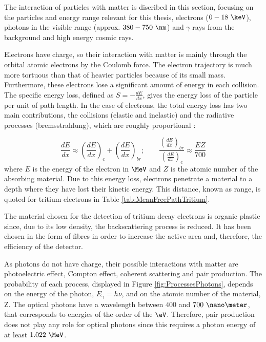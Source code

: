 The interaction of particles with matter is discribed in this section, focusing on the particles and energy range relevant for this thesis, electrons ($0-18~\keV$), photons in the visible range (approx. $380-750~\nm$) and $\gamma$ rays from the background and high energy cosmic rays.

Electrons have charge, so their interaction with matter is mainly through the orbital atomic  electrons by the Coulomb force. The electron trajectory is much more tortuous than that of heavier particles because of its small mass. Furthermore, these electrons lose a significant amount of energy in each collision. The specific energy loss, defined as $S=-\displaystyle{\frac{dE}{dx}}$, gives the energy loss of the particle per unit of path length. In the case of electrons, the total energy loss has two main contributions, the collisions (elastic and inelastic) and the radiative processes (bremsstrahlung), which are roughly proportional \cite{Knoll, Leo}:

\begin{equation}
\frac{dE}{dx} \approx \left(\frac{dE}{dx}\right)_{c} + \left(\frac{dE}{dx}\right)_{br} ; \qquad \frac{\displaystyle{\left(\frac{dE}{dx}\right)_{br}}}{\displaystyle{\left(\frac{dE}{dx}\right)_{c}}} \approx \frac{EZ}{700}
\label{eq:ElectronInteraction}
\end{equation}
where $E$ is the energy of the electron in $\MeV$ and $Z$ is the atomic number of the absorbing material. Due to this energy loss, electrons penetrate a material to a depth where they have lost their kinetic energy. This distance, known as range, is quoted for tritium electrons in Table \ref{tab:MeanFreePathTritium}. 

The material chosen for the detection of tritium decay electrons is organic plastic since, due to its low density, the backscattering process is reduced. It has been chosen in the form of fibres in order to increase the active area and, therefore, the efficiency of the detector.

As photons do not have charge, their possible interactions with matter are photoelectric effect, Compton effect, coherent scattering and pair production. The probability of each process, displayed in Figure \ref{fig:ProcessesPhotons}, depends on the energy of the photon, $E_\gamma = h\nu$, and on the atomic number of the material, Z. The optical photons have a wavelength between $400$ and $700~\nano\meter$, that corresponds to energies of the order of the $\eV$. Therefore, pair production does not play any role for optical photons since this requires a photon energy of at least $1.022~\MeV$.


